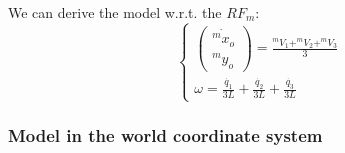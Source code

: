 We can derive the model w.r.t. the $RF_{m}$:
\begin{equation}
    \left\{
        \begin{array}{ll}
            \begin{pmatrix} 
                \dot{^m x_o} \\ 
                ^m y_o  
            \end{pmatrix} 
            = \frac
                {^m V_1 + ^m V_2 + ^m V_3}
                {3}\\
            
            \omega = \frac{\dot{q_{1}}}{3L} + \frac{\dot{q_{2}}}{3L} + \frac{\dot{q_{3}}}{3L}
        \end{array}
    \right.
\end{equation}
\subsubsection{Model in the world coordinate system}

